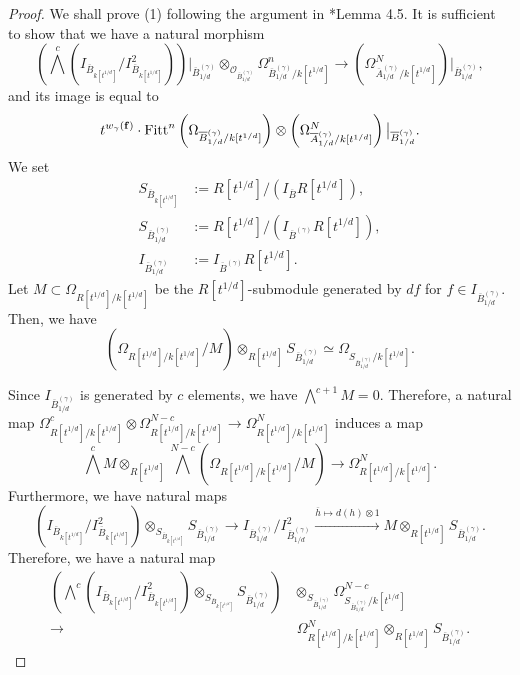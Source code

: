 \documentclass[a4paper,11pt]{amsart}
\theoremstyle{definition}
\theoremstyle{remark}
\begin{document}
\begin{proof}
We shall prove (1) following the argument in \cite{NS22}*{Lemma 4.5}. 
It is sufficient to show that we have a natural morphism 
\[
\left( \bigwedge ^{c} \left( I_{\overline{B}_{k[t^{1/d}]}}/ I^2_{\overline{B}_{k[t^{1/d}]}} \right) \right) \big|_{\overline{B}^{(\gamma)}_{1/d}} \otimes _{\mathcal{O}_{\overline{B}^{(\gamma)}_{1/d}}} \Omega ^n _{\overline{B}^{(\gamma)}_{1/d}/k[t^{1/d}]} \to \left( \Omega_{\overline{A}^{(\gamma)}_{1/d}/k[t^{1/d}]} ^N \right) \big|_{\overline{B}^{(\gamma)}_{1/d}}, 
\]
and its image is equal to 
\[
t^{w_\gamma({\bf f})} \cdot \operatorname{Fitt}^n \left( \Omega _{\overline{B}^{(\gamma)}_{1/d}/k[t^{1/d}]} \right) \otimes \left( \Omega_{\overline{A}^{(\gamma)}_{1/d}/k[t^{1/d}]} ^N \right) \big|_{\overline{B}^{(\gamma)}_{1/d}}. 
\]
We set 
\begin{align*}
S_{\overline{B}_{k[t^{1/d}]}} &:= R[t^{1/d}] \big/ \left(  I_{\overline{B}}R[t^{1/d}] \right), \\
S_{\overline{B}^{(\gamma)}_{1/d}} &:= R[t^{1/d}] \big/ \left(  I_{\overline{B}^{(\gamma)}} R[t^{1/d}] \right), \\ 
I_{\overline{B}^{(\gamma)}_{1/d}} &:=  I_{\overline{B}^{(\gamma)}} R[t^{1/d}]. 
\end{align*}
Let $M \subset \Omega _{R[t^{1/d}]/k[t^{1/d}]}$ be the $R[t^{1/d}]$-submodule generated by $df$ for $f \in I_{\overline{B}^{(\gamma)}_{1/d}}$. 
Then, we have 
\[
\left( \Omega _{R[t^{1/d}]/k[t^{1/d}]} \big/M \right) \otimes _{R[t^{1/d}]} S_{\overline{B}^{(\gamma)}_{1/d}} \simeq  \Omega _{S_{\overline{B}^{(\gamma)}_{1/d}}/k[t^{1/d}]}.
\]

Since $I_{\overline{B}^{(\gamma)}_{1/d}}$ is generated by $c$ elements, we have $\bigwedge ^{c+1} M = 0$. 
Therefore, a natural map $\Omega _{R[t^{1/d}]/k[t^{1/d}]} ^{c} \otimes \Omega _{R[t^{1/d}]/k[t^{1/d}]} ^{N-c} \to \Omega _{R[t^{1/d}]/k[t^{1/d}]} ^N$ induces a map 
\[
\bigwedge ^{c} M \otimes _{R[t^{1/d}]} \bigwedge ^{N-c} \left( \Omega _{R[t^{1/d}]/k[t^{1/d}]} \big/M \right) \to \Omega _{R[t^{1/d}]/k[t^{1/d}]} ^N. 
\] 
Furthermore, we have natural maps
\[
\left( I_{\overline{B}_{k[t^{1/d}]}}/ I^2_{\overline{B}_{k[t^{1/d}]}} \right) \otimes _{S_{\overline{B}_{k[t^{1/d}]}}} S_{\overline{B}^{(\gamma)}_{1/d}} \to I_{\overline{B}^{(\gamma)}_{1/d}}/ I^2 _{\overline{B}^{(\gamma)}_{1/d}} \xrightarrow{\overline{h} \mapsto d(h) \otimes 1} M \otimes _{R[t^{1/d}]} S_{\overline{B}^{(\gamma)}_{1/d}}. 
\]
Therefore, we have a natural map
\begin{align*}
\tag{iii}
\left( \bigwedge ^{c} \left( I_{\overline{B}_{k[t^{1/d}]}}/ I^2_{\overline{B}_{k[t^{1/d}]}} \right)  \otimes _{S_{\overline{B}_{k[t^{1/d}]}}} S_{\overline{B}^{(\gamma)}_{1/d}} \right) & \otimes _{S_{\overline{B}^{(\gamma)}_{1/d}}} \Omega _{S_{\overline{B}^{(\gamma)}_{1/d}}/k[t^{1/d}]} ^{N-c} \\
 \longrightarrow & \ \Omega _{R[t^{1/d}]/k[t^{1/d}]} ^N \otimes _{R[t^{1/d}]} S_{\overline{B}^{(\gamma)}_{1/d}}. 
\end{align*}


\end{proof}
\end{document}
